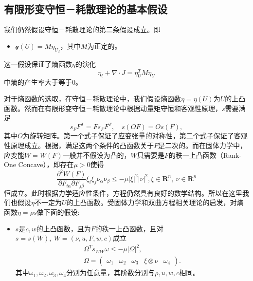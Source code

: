 \subsection{有限形变守恒－耗散理论的基本假设}
我们仍然假设守恒－耗散理论的第二条假设成立。即
\begin{itemize}
	\item $\mathcal{q}(U) = M \eta_{U_d}$，其中$M$为正定的。
\end{itemize}
这一假设保证了熵函数$\eta$的演化
\begin{equation}\label{eq:entropypro}
	\eta_t + \nabla \cdot J = \eta_U^T M \eta_U
\end{equation}
中熵的产生率大于等于$0$。

对于熵函数的选取，在守恒－耗散理论中，我们假设熵函数$\eta=\eta(U)$为$U$的上凸函数。然而在有限形变守恒－耗散理论中根据动量矩守恒和客观性原理，$s$需要满足
\begin{equation}\label{eq:sObjective}
	s_F F^T = F s_F F^T, \quad s(OF) = O s(F),
\end{equation}
其中$O$为旋转矩阵\cite{dafermos2013non}。第一个式子保证了应变张量的对称性，第二个式子保证了客观性原理成立。根据\cite{ball1976convexity}，满足这两个条件的凸函数关于$F$是二次的。而在固体力学中，应变能$W=W(F)$一般并不假设为凸的，$W$只需要是$F$的秩一上凸函数（Rank-One Concave），即存在$\mu>0$使得
\begin{equation*}
	\frac{\partial^2 W(F)}{\partial F_{i\alpha} \partial F_{j\beta}} \xi_i \xi_j \nu_\alpha \nu_\beta \le -\mu |\xi|^2 |\nu|^2, \xi \in \mathbf{R}^n, \ \nu \in \mathbf{R}^n
\end{equation*}
恒成立。此时根据力学适应性条件，方程仍然具有良好的数学结构。所以在这里我们也假设$\eta$不一定为$U$的上凸函数。受固体力学和双曲方程相关理论的启发，对熵函数$\eta = \rho s$做下面的假设:
\begin{itemize}
	\item $s$是$c,w$的上凸函数，且为$F$的秩一上凸函数，且对$s=s(W),\ W= (\nu,u,F,w,c)$成立
\begin{eqnarray}
	\Omega^T s_{WW} \omega \le -\mu |\Omega|^2, \label{eq:FCDFconvex}\\ 
	\Omega = \left( \begin{array}{cccccc}
		\omega_1 & \omega_2 & \omega_3 & \xi \otimes \nu & \omega_4
	\end{array}\right). \nonumber
\end{eqnarray}
其中$\omega_1,\omega_2,\omega_3,\omega_4$分别为任意量，其阶数分别与$\rho, u, w,c$相同。
\end{itemize}

